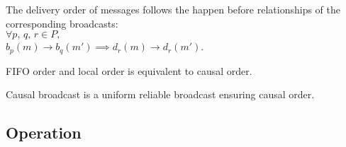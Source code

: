 \begin{definition}
  The delivery order of messages follows the happen before relationships of the
  corresponding broadcasts:\\ $\forall
  p,\,q,\,r \in P,\,$\\$b_p(m) \rightarrow b_q(m') \implies d_r(m) \rightarrow d_r(m')$.
\end{definition}

\begin{theorem}
  FIFO order and local order is equivalent to causal order.
\end{theorem}

\begin{definition}
  Causal broadcast is a uniform reliable broadcast ensuring causal order.
\end{definition}









\subsection{Operation}

